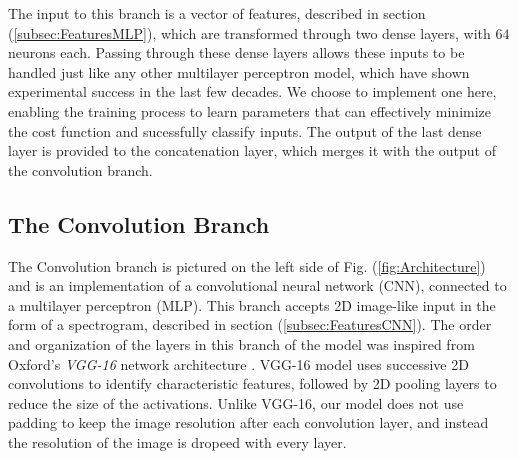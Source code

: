\documentclass[conference,onecolumn,letterpaper]{IEEEtran}
\begin{document}
The input to this branch is a vector of features, described in section (\ref{subsec:FeaturesMLP}), which are transformed through two dense layers, with $64$ neurons each. Passing through these dense layers allows these inputs to be handled just like any other multilayer perceptron model, which have shown experimental success in the last few decades. We choose to implement one here, enabling the training process to learn parameters that can effectively minimize the cost function and sucessfully classify inputs. The output of the last dense layer is provided to the concatenation layer, which merges it with the output of the convolution branch. 


\subsection{The Convolution Branch}
\label{subsec:CNN}

The Convolution branch is pictured on the left side of Fig. (\ref{fig:Architecture}) and is an implementation of a convolutional neural network (CNN), connected to a multilayer perceptron (MLP). This branch accepts 2D image-like input in the form of a spectrogram, described in section (\ref{subsec:FeaturesCNN}). The order and organization of the layers in this branch of the model was inspired from Oxford's \textit{VGG-16} network architecture \cite{Geron}. VGG-16 model uses successive 2D convolutions to identify characteristic features, followed by 2D pooling layers to reduce the size of the activations. Unlike VGG-16, our model does not use padding to keep the image resolution after each convolution layer, and instead the resolution of the image is dropeed with every layer.
\end{document}
